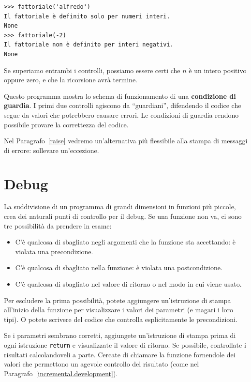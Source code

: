\documentclass[10pt]{book}
\begin{document}
\begin{verbatim}
>>> fattoriale('alfredo')
Il fattoriale è definito solo per numeri interi.
None
>>> fattoriale(-2)
Il fattoriale non è definito per interi negativi.
None
\end{verbatim}
% 
Se superiamo entrambi i controlli, possiamo essere
   certi che $n$ è un intero positivo oppure zero, e che la ricorsione avrà
   termine.

Questo programma mostra lo schema di funzionamento di una {\bf condizione di guardia}.
I primi due controlli agiscono da ``guardiani'', difendendo il codice che segue da valori che potrebbero causare errori. Le condizioni di guardia rendono possibile provare la correttezza del codice.

Nel Paragrafo~\ref{raise} vedremo un'alternativa più flessibile alla stampa di messaggi di errore: sollevare un'eccezione.


\section{Debug}
\label{factdebug}

La suddivisione di un programma di grandi dimensioni in funzioni più piccole, crea dei naturali punti di controllo per il debug. Se una funzione non va, ci sono tre possibilità da prendere in esame:

\begin{itemize}

\item C'è qualcosa di sbagliato negli argomenti che la funzione sta accettando: è violata una precondizione.

\item C'è qualcosa di sbagliato nella funzione: è violata una postcondizione.

\item C'è qualcosa di sbagliato nel valore di ritorno o nel modo in cui viene usato.

\end{itemize}

Per escludere la prima possibilità, potete aggiungere un'istruzione di stampa all'inizio della funzione per visualizzare i valori dei parametri (e magari i loro tipi). O potete scrivere del codice che controlla esplicitamente le precondizioni.

Se i parametri sembrano corretti, aggiungete un'istruzione di stampa prima di ogni istruzione {\tt return} e visualizzate il valore di ritorno. Se possibile, controllate i risultati calcolandoveli a parte. Cercate di chiamare la funzione fornendole dei valori che permettono un agevole controllo del risultato (come nel Paragrafo~\ref{incremental.development}).
\end{document}
